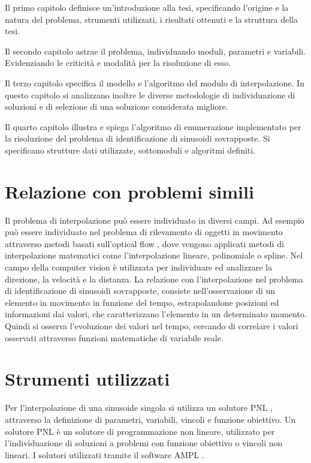 \documentclass[a4paper,12pt]{report}
\begin{document}
Il primo capitolo definisce un'introduzione alla tesi, specificando l'origine e la natura del problema, strumenti utilizzati, i risultati ottenuti e la struttura della tesi.

Il secondo capitolo astrae il problema, individuando moduli, parametri e variabili. Evidenziando le criticità e modalità per la risoluzione di esso.

Il terzo capitolo specifica il modello e l'algoritmo del modulo di interpolazione. In questo capitolo si analizzano inoltre le diverse metodologie di individuazione di soluzioni e di selezione di una soluzione considerata migliore.

Il quarto capitolo illustra e spiega l'algoritmo di enumerazione implementato per la risoluzione del problema di identificazione di sinusoidi sovrapposte. Si specificano strutture dati utilizzate, sottomoduli e algoritmi definiti.

\section{Relazione con problemi simili}
Il problema di interpolazione può essere individuato in diversi campi. Ad esempio può essere individuato nel problema di rilevamento di oggetti in movimento attraverso metodi basati sull'optical flow \cite{opticalFlow}, dove vengono applicati metodi di interpolazione matematici come l'interpolazione lineare, polinomiale o spline. Nel campo della computer vision è utilizzata per individuare ed analizzare la direzione, la velocità e la distanza.
La relazione con l'interpolazione nel problema di identificazione di sinusoidi sovrapposte, consiste nell'osservazione di un elemento in movimento in funzione del tempo, estrapolandone posizioni ed informazioni dai valori, che caratterizzano l'elemento in un determinato momento.  Quindi  si osserva l'evoluzione dei valori nel tempo, cercando di correlare i valori osservati attraverso funzioni matematiche di variabile reale.

\section{Strumenti utilizzati}
Per l'interpolazione di una sinusoide singola si utilizza un solutore PNL \cite{pnl}, attraverso la definizione di parametri, variabili, vincoli e funzione obiettivo. Un solutore PNL è un solutore di programmazione non lineare, utilizzato per l'individuazione di soluzioni a problemi con funzione obiettivo o vincoli non lineari. I solutori utilizzati tramite il software AMPL \cite{ampl}.
\end{document}
